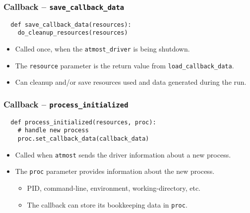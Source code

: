 \documentclass[compress,table,xcolor=table]{beamer}
\newcommand{\shelltext}[1]{\texttt{\colorbox{light-gray}{#1}}}
\begin{document}
\begin{frame}[fragile]
  \frametitle{Callback -- \shelltext{save\_callback\_data}}
  \begin{lstlisting}
  def save_callback_data(resources):
    do_cleanup_resources(resources)
  \end{lstlisting}
  \begin{itemize}
    \Large
    \item Called once, when the \shelltext{atmost\_driver} is being shutdown.
    \item The \shelltext{resource} parameter is the return value from
      \shelltext{load\_callback\_data}.
    \item Can cleanup and/or save resources used and data generated during the run.
  \end{itemize}
\end{frame}
\begin{frame}[fragile]
  \frametitle{Callback -- \shelltext{process\_initialized}}
  \begin{lstlisting}
  def process_initialized(resources, proc):
    # handle new process
    proc.set_callback_data(callback_data)
  \end{lstlisting}
  \begin{itemize}
    \Large
    \item Called when \shelltext{atmost} sends the driver information about a
      new process.
    \item The \shelltext{proc} parameter provides information about the new process.
    \begin{itemize}
      \normalsize
      \item PID, command-line, environment, working-directory, etc.
      \item The callback can store its bookkeeping data in \shelltext{proc}.
    \end{itemize}
  \end{itemize}
\end{frame}
\end{document}
